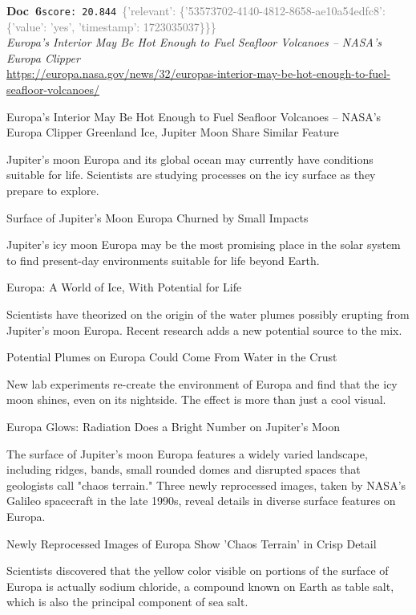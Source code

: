 \documentclass[a4paper,11pt]{article}
\begin{document}
\begin{docenv}
{\footnotesize\textcolor{doccolor}{\textbf{Doc~6}}}\hfill{\tiny\texttt{score:~20.844}}\ {\tiny\textcolor{gray}{\{'relevant': \{'53573702-4140-4812-8658-ae10a54edfc8': \{'value': 'yes', 'timestamp': 1723035037\}\}\}}}\\[3pt]
{\small\textit{Europa's Interior May Be Hot Enough to Fuel Seafloor Volcanoes – NASA's Europa Clipper}}\\[2pt]
{\tiny\url{https://europa.nasa.gov/news/32/europas-interior-may-be-hot-enough-to-fuel-seafloor-volcanoes/}}\\[4pt]
{\footnotesize Europa's Interior May Be Hot Enough to Fuel Seafloor Volcanoes – NASA's Europa Clipper
Greenland Ice, Jupiter Moon Share Similar Feature

Jupiter’s moon Europa and its global ocean may currently have conditions suitable for life. Scientists are studying processes on the icy surface as they prepare to explore.

Surface of Jupiter's Moon Europa Churned by Small Impacts

Jupiter’s icy moon Europa may be the most promising place in the solar system to find present-day environments suitable for life beyond Earth. 

Europa: A World of Ice, With Potential for Life

Scientists have theorized on the origin of the water plumes possibly erupting from Jupiter's moon Europa. Recent research adds a new potential source to the mix.

Potential Plumes on Europa Could Come From Water in the Crust

New lab experiments re-create the environment of Europa and find that the icy moon shines, even on its nightside. The effect is more than just a cool visual.

Europa Glows: Radiation Does a Bright Number on Jupiter's Moon

The surface of Jupiter's moon Europa features a widely varied landscape, including ridges, bands, small rounded domes and disrupted spaces that geologists call "chaos terrain." Three newly reprocessed images, taken by NASA's Galileo spacecraft in the late 1990s, reveal details in diverse surface features on Europa.

Newly Reprocessed Images of Europa Show 'Chaos Terrain' in Crisp Detail

Scientists discovered that the yellow color visible on portions of the surface of Europa is actually sodium chloride, a compound known on Earth as table salt, which is also the principal component of sea salt.

}
\end{docenv}
\end{document}
